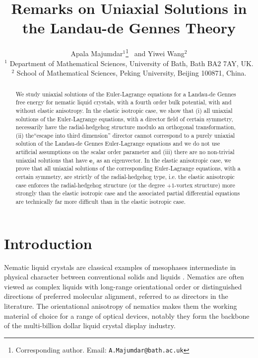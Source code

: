 \documentclass[10pt, a4paper]{article}
\title{Remarks on Uniaxial Solutions in the Landau-de Gennes Theory }
\author{Apala Majumdar$^1$\thanks{Corresponding author. Email: \tt{A.Majumdar@bath.ac.uk}} ~and Yiwei Wang$^2$ \vspace{1em} \\ 
       \small{$^1$ Department of Mathematical Sciences, University of Bath, Bath BA2 7AY, UK.} \\ 
       \small{$^2$ School of Mathematical Sciences, Peking University, Beijing 100871, China.} \\}
\date{}
\begin{document}
\maketitle                            



\begin{abstract}
We study uniaxial solutions of the Euler-Lagrange equations for a Landau-de Gennes free energy for nematic liquid crystals, with a fourth order bulk potential, with and without elastic anisotropy. In the elastic isotropic case, we show that (i) all uniaxial solutions of the Euler-Lagrange equations, with a director field of certain symmetry, necessarily have the radial-hedgehog structure modulo an orthogonal transformation, (ii) the``escape into third dimension'' director cannot correspond to a purely uniaxial solution of the Landau-de Gennes Euler-Lagrange equations and we do not use artificial assumptions on the scalar order parameter and (iii) there are no non-trivial uniaxial solutions that have $\mathbf{e}_z$ as an eigenvector. In the elastic anisotropic case, we prove that all uniaxial solutions of the corresponding Euler-Lagrange equations, with a certain symmetry, are strictly of the radial-hedgehog type, i.e. the elastic anisotropic case enforces the radial-hedgehog structure (or the degree $+1$-vortex structure) more strongly than the elastic isotropic case and the associated partial differential equations are technically far more difficult than in the elastic isotropic case.
\end{abstract}





\section{Introduction}
\label{sec:intro}
Nematic liquid crystals are classical examples of mesophases intermediate in physical character between conventional solids and liquids \cite{dg, newtonmottram}. Nematics are often viewed as complex liquids with long-range orientational order or distinguished directions of preferred molecular alignment, referred to as directors in the literature. The orientational anisotropy of nematics makes them the working material of choice for a range of optical devices, notably they form the backbone of the multi-billion dollar liquid crystal display industry.
\end{document}
